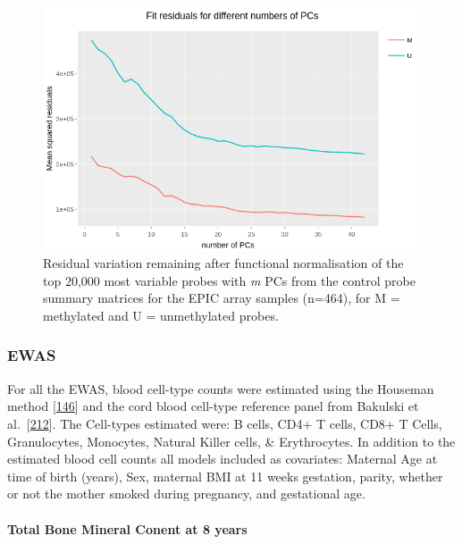 \documentclass[
]{book}
\begin{document}
\begin{figure}

{\centering \includegraphics[width=0.8\linewidth]{figs/SWSfunnormPCsEPIC} 

}

\caption{Residual variation remaining after functional normalisation of the top 20,000 most variable probes with \emph{m} PCs from the control probe summary matrices for the EPIC array samples (n=464), for M = methylated and U = unmethylated probes.}\label{fig:SWSfunnormPCsEPIC}
\end{figure}



\hypertarget{ewas-1}{%
\subsubsection{EWAS}\label{ewas-1}}

For all the EWAS, blood cell-type counts were estimated using the Houseman method {[}\protect\hyperlink{ref-Houseman2012}{146}{]} and the cord blood cell-type reference panel from Bakulski et al.~{[}\protect\hyperlink{ref-Bakulski2016}{212}{]}.
The Cell-types estimated were: B cells, CD4+ T cells, CD8+ T Cells, Granulocytes, Monocytes, Natural Killer cells, \& Erythrocytes.
In addition to the estimated blood cell counts all models included as covariates: Maternal Age at time of birth (years), Sex, maternal BMI at 11 weeks gestation, parity, whether or not the mother smoked during pregnancy, and gestational age.

\hypertarget{total-bone-mineral-conent-at-8-years}{%
\paragraph{Total Bone Mineral Conent at 8 years}\label{total-bone-mineral-conent-at-8-years}}
\end{document}
